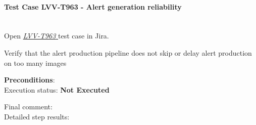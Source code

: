 \documentclass[DM,lsstdraft,STR,toc]{lsstdoc}
\begin{document}
    \paragraph{Test Case LVV-T963 - Alert generation reliability
 }\mbox{}\\

Open  \href{https://jira.lsstcorp.org/secure/Tests.jspa#/testCase/LVV-T963}{\textit{ LVV-T963 } }
test case in Jira.

    Verify that the alert production pipeline does not skip or delay alert
production on too many images


    \textbf{ Preconditions}:\\
    

    Execution status: {\bf Not Executed }

    Final comment:\\


    Detailed step results:
\end{document}
